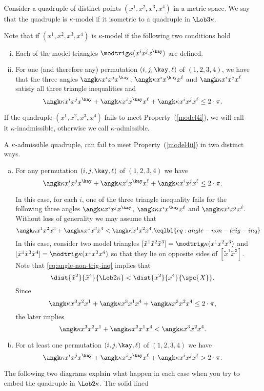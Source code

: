 Consider a quadruple of distinct points $(x^1,x^2,x^3,x^4)$ in a metric space.
We say that the quadruple is $\kappa$-model if it isometric to a quadruple in $\Lob3\kappa$.

Note that if $(x^1,x^2,x^3,x^4)$ is $\kappa$-model
if the following two conditions hold
\begin{enumerate}[(i)]
\item\label{model4i} Each of the model triangles 
$\modtrig\kappa(x^ix^jx^\kay)$ are defined.
\item\label{model4ii} For one (and therefore any) permutation $(i,j,\kay,\ell)$
of $(1,2,3,4)$, 
we have that the three angles $\angk\kappa{x^i}{x^j}{x^\kay}$,
$\angk\kappa{x^i}{x^\kay}{x^\ell}$ and $\angk\kappa{x^i}{x^j}{x^\ell}$
satisfy all three triangle inequalities 
and
\[\angk\kappa{x^i}{x^j}{x^\kay}+\angk\kappa{x^i}{x^\kay}{x^\ell}+\angk\kappa{x^i}{x^j}{x^\ell}
\le 
2\cdot\pi.\]
\end{enumerate}

If the quadruple $(x^1,x^2,x^3,x^4)$ fails to meet Property~(\ref{model4i}),
we will call it $\kappa$-inadmissible, otherwise we call $\kappa$-admissible.

A $\kappa$-admissible quadruple,
can fail to meet  Property~(\ref{model4ii}) in two distinct ways.
\begin{enumerate}[(a)]
\item\label{model4ii-a} For any permutation $(i,j,\kay,\ell)$
of $(1,2,3,4)$ we have
\[\angk\kappa{x^i}{x^j}{x^\kay}
+
\angk\kappa{x^i}{x^\kay}{x^\ell}
+
\angk\kappa{x^i}{x^j}{x^\ell}
\le 
2\cdot\pi.\]

In this case, for each $i$,
one of the three triangle inequality fails 
for the following three angles $\angk\kappa{x^i}{x^j}{x^\kay}$,
$\angk\kappa{x^i}{x^\kay}{x^\ell}$ and $\angk\kappa{x^i}{x^j}{x^\ell}$.
Without loss of generality we may assume that
\[
\angk\kappa{x^1}{x^2}{x^3}
+
\angk\kappa{x^1}{x^3}{x^4}
<
\angk\kappa{x^1}{x^2}{x^4}.
\eqlbl{eq:angle-non-trig-inq}\]
In this case, 
consider two model triangles $[\tilde x^1\tilde x^2\tilde x^3]=\modtrig\kappa(x^1x^2x^3)$
and
$[\tilde x^1\tilde x^3\tilde x^4]=\modtrig\kappa(x^1x^3x^4)$
so that they lie on opposite sides of $[\tilde x^1\tilde x^3]$.
Note that \ref{eq:angle-non-trig-inq} implies that 
\[\dist{\tilde x^2}{\tilde x^4}{\Lob2\kappa}
<
\dist{x^2}{x^4}{\spc{X}}.
\]
Since 
\[
\angk\kappa{x^3}{x^2}{x^1}
+
\angk\kappa{x^3}{x^1}{x^4}
+
\angk\kappa{x^3}{x^2}{x^4}\le 2\cdot\pi,
\]
the later implies 
\[
\angk\kappa{x^3}{x^2}{x^1}
+
\angk\kappa{x^3}{x^1}{x^4}
<
\angk\kappa{x^3}{x^2}{x^4}.
\]




\item\label{model4ii-b} For at least one permutation $(i,j,\kay,\ell)$
of $(1,2,3,4)$ we have
\[\angk\kappa{x^i}{x^j}{x^\kay}
+
\angk\kappa{x^i}{x^\kay}{x^\ell}
+
\angk\kappa{x^i}{x^j}{x^\ell}
> 
2\cdot\pi.\]
\end{enumerate}
The following two diagrams explain what happen in each case when you try to embed the quadruple in $\Lob2\kappa$.
The solid lined 

